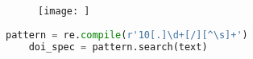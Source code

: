 

\begin{figure}[h]
  \texttt{[image: ]}
  \caption{}
  \label{fig:}
\end{figure}



\begin{lstlisting}[label=code:regex, language=python, caption = regulärer Ausdruck]
    pattern = re.compile(r'10[.]\d+[/][^\s]+')
    doi_spec = pattern.search(text)
\end{lstlisting}

